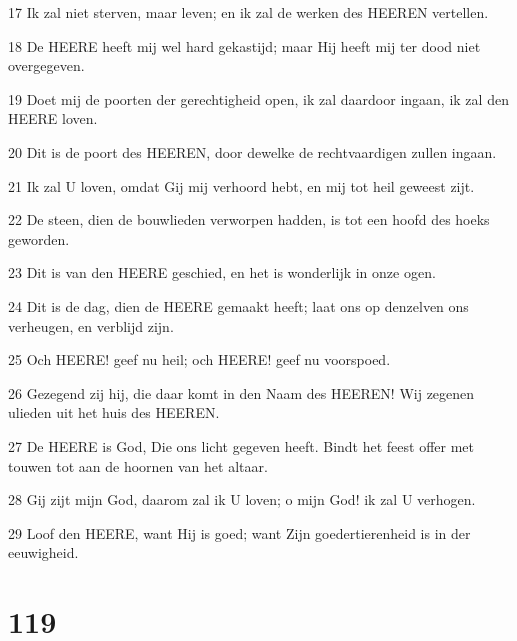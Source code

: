 \par 17 Ik zal niet sterven, maar leven; en ik zal de werken des HEEREN vertellen.
\par 18 De HEERE heeft mij wel hard gekastijd; maar Hij heeft mij ter dood niet overgegeven.
\par 19 Doet mij de poorten der gerechtigheid open, ik zal daardoor ingaan, ik zal den HEERE loven.
\par 20 Dit is de poort des HEEREN, door dewelke de rechtvaardigen zullen ingaan.
\par 21 Ik zal U loven, omdat Gij mij verhoord hebt, en mij tot heil geweest zijt.
\par 22 De steen, dien de bouwlieden verworpen hadden, is tot een hoofd des hoeks geworden.
\par 23 Dit is van den HEERE geschied, en het is wonderlijk in onze ogen.
\par 24 Dit is de dag, dien de HEERE gemaakt heeft; laat ons op denzelven ons verheugen, en verblijd zijn.
\par 25 Och HEERE! geef nu heil; och HEERE! geef nu voorspoed.
\par 26 Gezegend zij hij, die daar komt in den Naam des HEEREN! Wij zegenen ulieden uit het huis des HEEREN.
\par 27 De HEERE is God, Die ons licht gegeven heeft. Bindt het feest offer met touwen tot aan de hoornen van het altaar.
\par 28 Gij zijt mijn God, daarom zal ik U loven; o mijn God! ik zal U verhogen.
\par 29 Loof den HEERE, want Hij is goed; want Zijn goedertierenheid is in der eeuwigheid.

\chapter{119}

